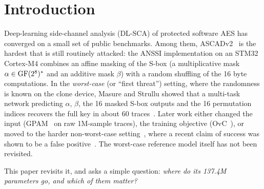\section{Introduction}
\label{sec:intro}

Deep-learning side-channel analysis (DL-SCA) of protected software AES has converged on a small set
of public benchmarks. Among them, ASCADv2~\cite{MS23} is the hardest that is still routinely
attacked: the ANSSI implementation on an STM32 Cortex-M4 combines an affine masking of the S-box
(a multiplicative mask $\alpha\in\mathrm{GF}(2^8)^\ast$ and an additive mask $\beta$) with a random shuffling of
the 16 byte computations. In the \emph{worst-case} (or ``first threat'') setting, where the
randomness is known on the clone device, Masure and Strullu showed that a multi-task network
predicting $\alpha$, $\beta$, the 16 masked S-box outputs and the 16 permutation indices recovers the
full key in about 60 traces~\cite{MS23}. Later work either changed the input
(GPAM~\cite{GPAM} on raw 1M-sample traces), the training objective (OvC~\cite{OvC}), or moved to the
harder non-worst-case setting~\cite{Scoop}, where a recent claim of success was shown to be a false
positive~\cite{ReallyBroken}. The worst-case reference model itself has not been revisited.

This paper revisits it, and asks a simple question: \emph{where do its 137.4M parameters go, and
which of them matter?}

